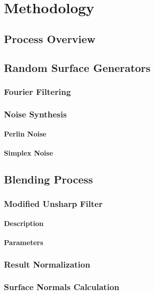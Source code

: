 \chapter{Methodology}

\section{Process Overview}

\section{Random Surface Generators}
  \subsection{Fourier Filtering}
    \subsection{Noise Synthesis}
      \subsubsection{Perlin Noise}
      \subsubsection{Simplex Noise}

\section{Blending Process}

  \subsection{Modified Unsharp Filter}
    \subsubsection{Description} %
    \subsubsection{Parameters}
  \subsection{Result Normalization}
  \subsection{Surface Normals Calculation}
 